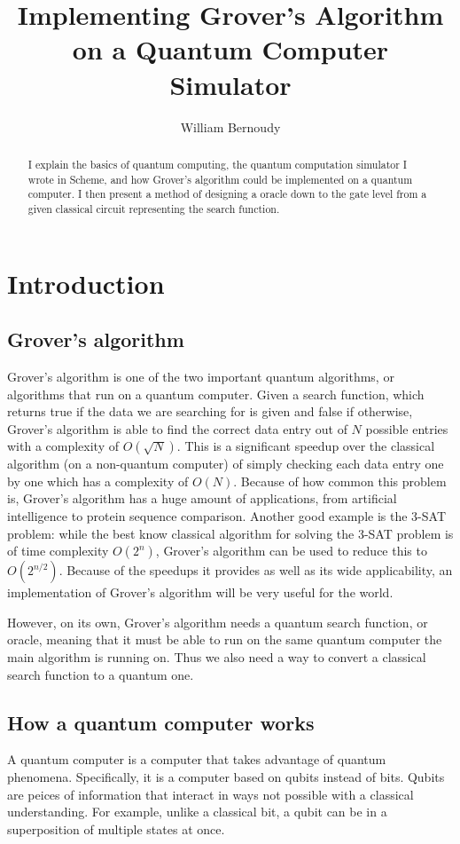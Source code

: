 \documentclass[11pt]{article}
\title{\textbf{Implementing Grover's Algorithm on a Quantum Computer Simulator}}
\author{William Bernoudy}
\date{}
\begin{document}
\maketitle

\begin{abstract}
I explain the basics of quantum computing, the quantum computation simulator I wrote in Scheme, and how Grover's algorithm could be implemented on a quantum computer. I then present a method of designing a oracle down to the gate level from a given classical circuit representing the search function.
\end{abstract}
\section{Introduction}
\subsection{Grover's algorithm}

Grover's algorithm is one of the two important quantum algorithms, or algorithms that run on a quantum computer. Given a search function, which returns true if the data we are searching for is given and false if otherwise, Grover's algorithm is able to find the correct data entry out of $N$ possible entries with a complexity of $O(\sqrt{N})$. This is a significant speedup over the classical algorithm (on a non-quantum computer) of simply checking each data entry one by one which has a complexity of $O(N)$. Because of how common this problem is, Grover's algorithm has a huge amount of applications, from artificial intelligence to protein sequence comparison. Another good example is the 3-SAT problem: while the best know classical algorithm for solving the 3-SAT problem is of time complexity $O(2^{n})$, Grover's algorithm can be used to reduce this to $O(2^{n/2})$. Because of the speedups it provides as well as its wide applicability, an implementation of Grover's algorithm will be very useful for the world.

However, on its own, Grover's algorithm needs a quantum search function, or oracle, meaning that it must be able to run on the same quantum computer the main algorithm is running on. Thus we also need a way to convert a classical search function to a quantum one.

\subsection{How a quantum computer works}
A quantum computer is a computer that takes advantage of quantum phenomena. Specifically, it is a computer based on qubits instead of bits. Qubits are peices of information that interact in ways not possible with a classical understanding. For example, unlike a classical bit, a qubit can be in a superposition of multiple states at once.
\end{document}
